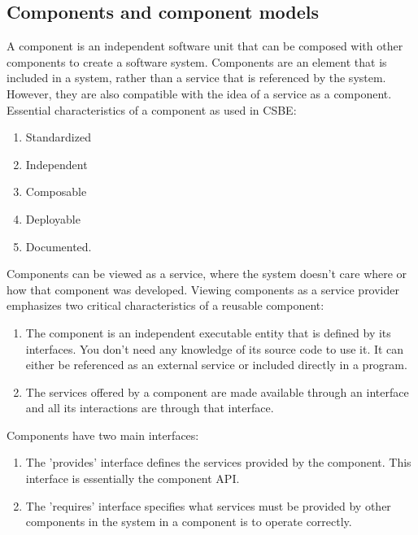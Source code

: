 \documentclass{article}
\begin{document}
\subsection{Components and component models}
A component is an independent software unit that can be composed with other components to create a software system.
Components are an element that is included in a system, rather than a service that is referenced by the system.  However, they are also compatible with the idea of a service as a component.
Essential characteristics of a component as used in CSBE:
\begin{enumerate}
\item Standardized
\item Independent
\item Composable
\item Deployable
\item Documented.
\end{enumerate}
Components can be viewed as a service, where the system doesn't care where or how that component was developed.
Viewing components as a service provider emphasizes two critical characteristics of a reusable component:
\begin{enumerate}
\item The component is an independent executable entity that is defined by its interfaces.  You don't need any knowledge of its source code to use it.  It can either be referenced as an external service or included directly in a program.
\item The services offered by a component are made available through an interface and all its interactions are through that interface.
\end{enumerate}
Components have two main interfaces:
\begin{enumerate}
\item The 'provides' interface defines the services provided by the component.  This interface is essentially the component API.
\item The 'requires' interface specifies what services must be provided by other components in the system in a component is to operate correctly.
\end{enumerate}
\end{document}
